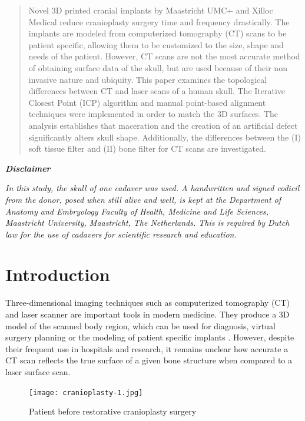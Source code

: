 \documentclass[a4paper]{article}
\begin{document}
\vspace{10.0cm}
\begin{abstract}
Novel 3D printed cranial implants by Maastricht UMC+ and Xilloc Medical reduce cranioplasty surgery time and frequency drastically. The implants are modeled from computerized tomography (CT) scans to be patient specific, allowing them to be customized to the size, shape and needs of the patient. However, CT scans are not the most accurate method of obtaining surface data of the skull, but are used because of their non invasive nature and ubiquity. This paper examines the topological differences between CT and laser scans of a human skull. The Iterative Closest Point (ICP) algorithm and manual point-based alignment techniques were implemented in order to match the 3D surfaces. The analysis establishes that maceration and the creation of an artificial defect significantly alters skull shape. Additionally, the differences between the (I) soft tissue filter and (II) bone filter for CT scans are investigated.

\end{abstract}
	\newpage
	\tableofcontents
	\newpage
\begin{center}\textbf{\emph{Disclaimer} }\end{center}
\small\emph{In this study, the skull of one cadaver was used. A handwritten and signed codicil from the donor, posed when still alive and well, is kept at the Department of Anatomy and Embryology Faculty of Health, Medicine and Life Sciences, Maastricht University, Maastricht, The Netherlands. This is required by Dutch law for the use of cadavers for scientific research and education.}

\section{Introduction} %
Three-dimensional imaging techniques such as computerized tomography (CT) and laser scanner are important tools in modern medicine. They produce a 3D model of the scanned body region, which can be used for diagnosis, virtual surgery planning or the modeling of patient specific implants \citep{rengier20103d}. However, despite their frequent use in hospitals and research, it remains unclear how accurate a CT scan reflects the true surface of a given bone structure when compared to a laser surface scan.

\begin{figure}[!ht]
		\centering
			\texttt{[image: cranioplasty-1.jpg]}
\caption{\label{fig:patient}Patient before restorative cranioplasty surgery \citep*{patient_figure}}
\end{figure}
\end{document}
